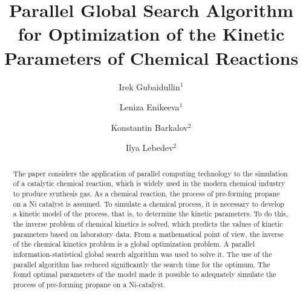 \documentclass{svproc}
\def\orcidID#1{\unskip$^{[#1]}$}
\begin{document}
\mainmatter              %
%
\title{Parallel Global Search Algorithm for Optimization of the Kinetic Parameters of Chemical Reactions}
%
%
\author{
Irek Gubaidullin$^{1}$\and
Leniza Enikeeva$^{1}$\and
Konstantin Barkalov$^2$%
\and
Ilya Lebedev$^2$%
}

%
%
%


	
\maketitle              %

\begin{abstract}
The paper considers the application of parallel computing technology to the simulation of a catalytic chemical reaction, which is widely used in the modern chemical industry to produce synthesis gas. As a chemical reaction, the process of pre-forming propane on a Ni catalyst is assumed. To simulate a chemical process, it is necessary to develop a kinetic model of the process, that is, to determine the kinetic parameters. To do this, the inverse problem of chemical kinetics is solved, which predicts the values of kinetic parameters based on laboratory data. From a mathematical point of view, the inverse of the chemical kinetics problem is a global optimization problem. A parallel information-statistical global search algorithm was used to solve it. The use of the parallel algorithm has reduced significantly the search time for the optimum. The found optimal parameters of the model made it possible to adequately simulate the process of pre-forming propane on a Ni-catalyst.

\end{abstract}
\end{document}
